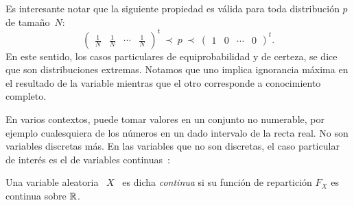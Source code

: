 {Es  interesante  notar  que  la   siguiente  propiedad  es  v\'alida  para  toda
distribuci\'on $p$ de tama\~no~$N$:
%
$$
\begin{pmatrix} \frac1N & \frac1N & \cdots & \frac1N \end{pmatrix}^t \ \prec \ p
\ \prec \ \begin{pmatrix} 1 & 0 & \cdots & 0 \end{pmatrix}^t.
$$
%
En este  sentido, los  casos particulares de  equiprobabilidad y de  certeza, se
dice  que  son  distribuciones  extremas.  Notamos que  uno  implica  ignorancia
m\'axima  en el  resultado de  la variable  mientras que  el otro  corresponde a
conocimiento completo.
%
\begin{figure}[h!] %
%
\label{fig:majorizationplot}
\end{figure}
}




\label{sec:MP:VAContinua}

En  varios contextos,  puede  tomar valores  en  un conjunto  no numerable,  por
ejemplo cualesquiera de los n\'umeros en un dado intervalo de la recta real.  No
son variables  discretas m\'as. En las  variables que no son  discretas, el caso
particular de inter\'es es el de variables continuas~\cite{AthLah06, HogMck13}:
%
\begin{definicion}
  Una variable  aleatoria \  $X$ \ es  dicha {\it  continua} si su  funci\'on de
  repartici\'on  $F_X$ es  continua sobre  $\mathbb{R}$.
\end{definicion}

